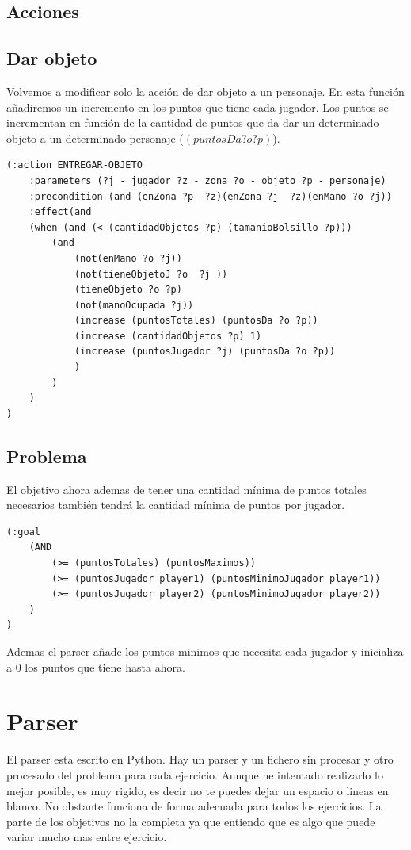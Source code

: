 \documentclass[12pt,a4paper]{article}
\begin{document}
\subsection{Acciones} 
\subsection{Dar objeto}
Volvemos a modificar solo la acción de dar objeto a un personaje. En esta función añadiremos un incremento en los puntos que tiene cada jugador. Los puntos se incrementan en función de la cantidad de puntos que da dar un determinado objeto a un determinado personaje ($(puntosDa ?o ?p)$).
\begin{lstlisting}
(:action ENTREGAR-OBJETO
	:parameters (?j - jugador ?z - zona ?o - objeto ?p - personaje)
	:precondition (and (enZona ?p  ?z)(enZona ?j  ?z)(enMano ?o ?j))
	:effect(and 
	(when (and (< (cantidadObjetos ?p) (tamanioBolsillo ?p)))
		(and
			(not(enMano ?o ?j))
			(not(tieneObjetoJ ?o  ?j ))
			(tieneObjeto ?o ?p)
			(not(manoOcupada ?j))
			(increase (puntosTotales) (puntosDa ?o ?p))
			(increase (cantidadObjetos ?p) 1)
			(increase (puntosJugador ?j) (puntosDa ?o ?p))
			)
		)
	)
)
\end{lstlisting}

\subsection{Problema}
El objetivo ahora ademas de tener una cantidad mínima de puntos totales necesarios también tendrá la cantidad mínima de puntos por jugador. 
\begin{lstlisting}
(:goal 
	(AND 
		(>= (puntosTotales) (puntosMaximos))
		(>= (puntosJugador player1) (puntosMinimoJugador player1))
		(>= (puntosJugador player2) (puntosMinimoJugador player2))
	)
)
\end{lstlisting}
Ademas el parser añade los puntos minimos que necesita cada jugador y inicializa a 0 los puntos que tiene hasta ahora. 
\section{Parser}
El parser esta escrito en Python. Hay un parser y un fichero sin procesar y otro procesado del problema para cada ejercicio. Aunque he intentado realizarlo lo mejor posible, es muy rigido, es decir no te puedes dejar un espacio o lineas en blanco. No obstante funciona de forma adecuada para todos los ejercicios. La parte de los objetivos no la completa ya que entiendo que es algo que puede variar mucho mas entre ejercicio.
\end{document}
